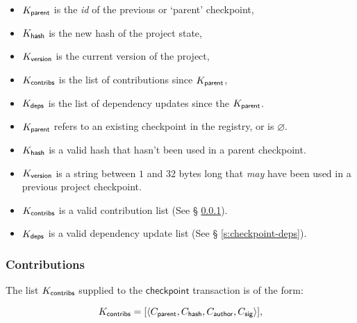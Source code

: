 \begin{itemize}
    \item $K_{\mathsf{parent}}$ is the \emph{id} of the previous or `parent' checkpoint,
    \item $K_{\mathsf{hash}}$ is the new hash of the project state,
    \item $K_{\mathsf{version}}$ is the current version of the project,
    \item $K_{\mathsf{contribs}}$ is the list of contributions since $K_{\mathsf{parent}}$,
    \item $K_{\mathsf{deps}}$ is the list of dependency updates since the $K_{\mathsf{parent}}$.
\end{itemize}
\validation
\begin{itemize}
    \item{$K_{\mathsf{parent}}$ refers to an existing checkpoint in the registry,
        or is $\varnothing$.}
    \item{$K_{\mathsf{hash}}$ is a valid hash that hasn't been used in a parent
        checkpoint.}
    \item{$K_{\mathsf{version}}$ is a string between $1$ and $32$ bytes long that
        \emph{may} have been used in a previous project checkpoint.}
    \item{$K_{\mathsf{contribs}}$ is a valid contribution list (See \S
        \ref{s:checkpoint-contribs}).}
    \item{$K_{\mathsf{deps}}$ is a valid dependency update list (See \S
        \ref{s:checkpoint-deps}).}
\end{itemize}

\subsubsection{Contributions}
\label{s:checkpoint-contribs}
The list $K_{\mathsf{contribs}}$ supplied to the $\mathsf{checkpoint}$
transaction is of the form:

\[
    K_{\mathsf{contribs}} = [\langle C_{\mathsf{parent}}, C_{\mathsf{hash}},
    C_{\mathsf{author}}, C_{\mathsf{sig}}\rangle],
\]

